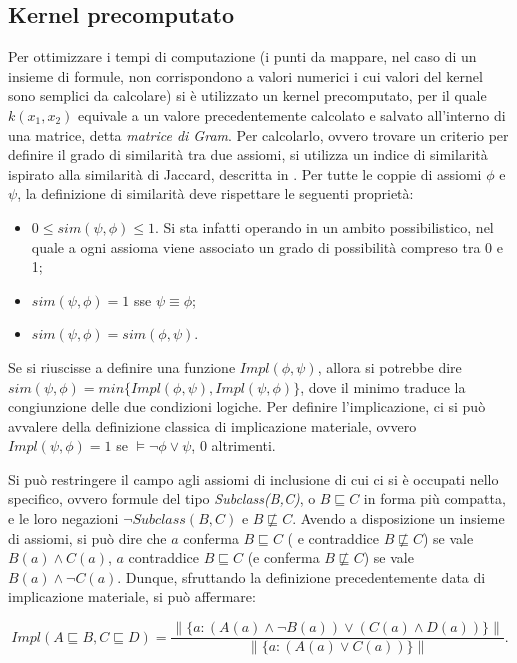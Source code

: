 \documentclass[12pt,a4paper]{report}
\begin{document}
\subsection{Kernel precomputato}
Per ottimizzare i tempi di computazione (i punti da mappare, nel caso di un insieme di formule, non corrispondono a valori numerici i cui valori del kernel sono semplici da calcolare) si è utilizzato un kernel precomputato, per il quale  $k(x_1,x_2)$ equivale a un valore precedentemente calcolato e salvato all'interno di una matrice, detta \emph{matrice di Gram}.
Per calcolarlo, ovvero trovare un criterio per definire il grado di similarità tra due assiomi, si utilizza un indice di similarità ispirato alla similarità di Jaccard, descritta in \cite{sacpaper}.
Per tutte le coppie di assiomi $\phi$ e $\psi$, la definizione di similarità deve rispettare le seguenti proprietà:
\begin{itemize}
\item $0 \leq sim(\psi, \phi) \leq 1$. Si sta infatti operando in un ambito possibilistico, nel quale a ogni assioma viene associato un grado di possibilità compreso tra 0 e 1;
\item $sim(\psi, \phi) = 1$ sse $\psi \equiv \phi $;
\item $sim(\psi, \phi) = sim(\phi,\psi)$.
\end{itemize}
Se si riuscisse a definire una funzione $Impl(\phi,\psi)$, allora si potrebbe dire $sim(\psi, \phi) = min\{Impl(\phi,\psi), Impl(\psi,\phi)\}$, dove il minimo traduce la congiunzione delle due condizioni logiche.
Per definire l'implicazione, ci si può avvalere della definizione classica di implicazione materiale, ovvero $Impl(\psi,\phi) = 1$ se $\models \lnot \phi \lor \psi$, 0 altrimenti.


Si può restringere il campo agli assiomi di inclusione di cui ci si è occupati nello specifico, ovvero formule del tipo \emph{Subclass(B,C)}, o 	$B \sqsubseteq C$ in forma più compatta, e le loro negazioni \emph{ $\lnot Subclass(B,C)$} e {$ B \not\sqsubseteq C$}.
Avendo a disposizione un insieme di assiomi, si può dire che $a$ conferma $B \sqsubseteq C$ ( e contraddice  {$ B \not\sqsubseteq C$}) se vale $B(a) \land C(a)$, $a$ contraddice  $B \sqsubseteq C$ (e conferma {$ B \not\sqsubseteq C$}) se vale $B(a) \land \lnot C(a)$.
Dunque, sfruttando la definizione precedentemente data di implicazione materiale, si può affermare:

\[Impl(A \sqsubseteq B, C \sqsubseteq D) = \frac{\parallel \{ a: (A(a) \land \lnot B(a)) \lor (C(a) \land D(a)) \} \parallel}{\parallel \{ a: (A(a) \lor C(a))\} \parallel}. \]
\end{document}
